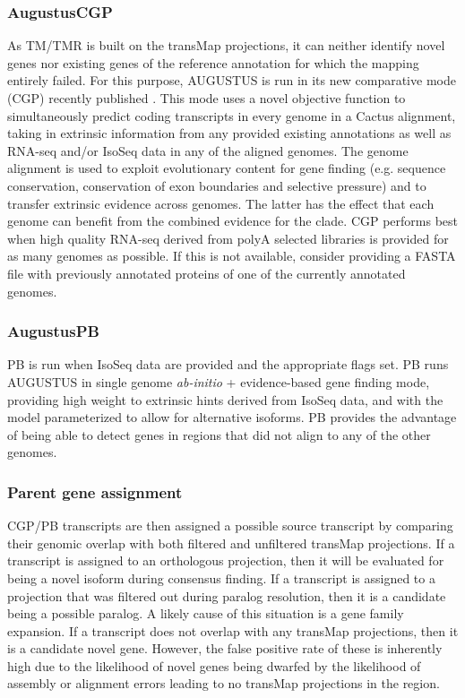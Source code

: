 \documentclass[fleqn,10pt]{wlscirep}
\begin{document}
\subsubsection*{AugustusCGP}
	As TM/TMR is built on the transMap projections, it can neither identify novel genes nor existing genes of the reference annotation for which the mapping entirely failed. For this purpose, AUGUSTUS is run in its new comparative mode (CGP) recently published \cite{konig2015simultaneous}. This mode uses a novel objective function to simultaneously predict coding transcripts in every genome in a Cactus alignment, taking in extrinsic information from any provided existing annotations as well as RNA-seq and/or IsoSeq data in any of the aligned genomes. The genome alignment is used to exploit evolutionary content for gene finding (e.g. sequence conservation, conservation of exon boundaries and selective pressure) and to transfer extrinsic evidence across genomes. The latter has the effect that each genome can benefit from the combined evidence for the clade. CGP performs best when high quality RNA-seq derived from polyA selected libraries is provided for as many genomes as possible. If this is not available, consider providing a FASTA file with previously annotated proteins of one of the currently annotated genomes. 
    
\subsubsection*{AugustusPB}
	PB is run when IsoSeq data are provided and the appropriate flags set. PB runs AUGUSTUS in single genome \textit{ab-initio} + evidence-based gene finding mode, providing high weight to extrinsic hints derived from IsoSeq data, and with the model parameterized to allow for alternative isoforms. PB provides the advantage of being able to detect genes in regions that did not align to any of the other genomes.
    
\subsubsection*{Parent gene assignment}
CGP/PB transcripts are then assigned a possible source transcript by comparing their genomic overlap with both filtered and unfiltered transMap projections. If a transcript is assigned to an orthologous projection, then it will be evaluated for being a novel isoform during consensus finding. If a transcript is assigned to a projection that was filtered out during paralog resolution, then it is a candidate being a possible paralog. A likely cause of this situation is a gene family expansion. If a transcript does not overlap with any transMap projections, then it is a candidate novel gene. However, the false positive rate of these is inherently high due to the likelihood of novel genes being dwarfed by the likelihood of assembly or alignment errors leading to no transMap projections in the region.
\end{document}
